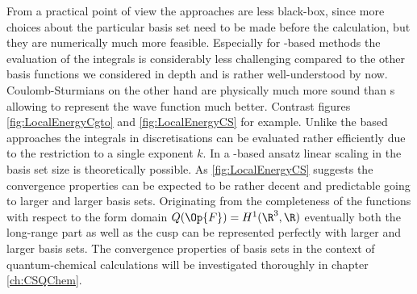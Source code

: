 From a practical point of view
the \ACO approaches are less black-box,
since more choices about the particular basis set need to be made before the calculation,
but they are numerically much more feasible.
Especially for \cGTO-based methods the evaluation of the integrals
is considerably less challenging compared to the other basis functions
we considered in depth and is rather well-understood by now.
Coulomb-Sturmians on the other hand are physically much more sound than
{\cGTO}s allowing to represent the wave function
much better.
Contrast figures \vref{fig:LocalEnergyCgto} and \vref{fig:LocalEnergyCS} for example.
Unlike the \STO based approaches
the integrals in \CS discretisations can be evaluated rather efficiently
due to the restriction to a single exponent $k$.
In a \contraction-based ansatz linear scaling in the basis set size
is theoretically possible.
As \ref{fig:LocalEnergyCS} suggests the convergence properties
can be expected to be rather decent and predictable
going to larger and larger basis sets.
Originating from the completeness of the \CS functions
with respect to the form domain $Q(\Op{F}) = H^1(\R^3,\R)$
eventually both the long-range part as well as the cusp can be represented
perfectly with larger and larger basis sets.
The convergence properties of \CS basis sets in the context of
quantum-chemical calculations will be investigated
thoroughly in chapter \vref{ch:CSQChem}.
